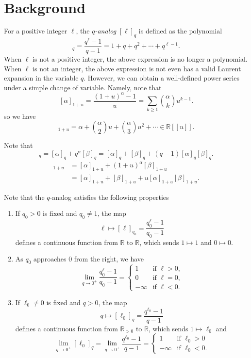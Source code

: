 \documentclass{amsart}
\theoremstyle{definition}
\newcommand{\RR}{\mathbb{R}}
\begin{document}
\section{Background}
For a positive integer $\ell$,
the {\em $q$-analog}
$[\ell]_q$ is defined as
the polynomial
\begin{equation*}
[\ell]_q = \frac{q^\ell - 1}{q - 1}
= 1 + q + q^2 + \cdots + q^{\ell -1} .
\end{equation*}
When $\ell$ is not a positive integer, the above expression is no longer a polynomial.
When $\ell$ is not an integer, the above expression is not even has a valid Laurent expansion in the variable $q$.
However, we can obtain a well-defined power series under a simple change of variable.
Namely, note that
\[ [\alpha]_{1+u} = \frac{(1+u)^\alpha - 1}{u}
= \sum_{k \geq 1} \binom{\alpha}{k}u^{k-1} .
\]
so we have 
\begin{equation}
[\alpha]_{1+u} = \alpha + \binom{\alpha}{2} u + \binom{\alpha}{3} u^2 + \cdots
\in \RR[[u]] .
\end{equation}

Note that
\begin{equation*}
[\alpha + \beta]_q =  [\alpha]_q + q^{\alpha} [\beta]_q
 = [\alpha]_q + [\beta]_q + (q-1) [\alpha]_q [\beta]_q .
\end{equation*}
\begin{align*}
[\alpha + \beta]_{1+u} &=  [\alpha]_{1+u} + (1+u)^{\alpha} [\beta]_{1+u} \\
 &= [\alpha]_{1+u} + [\beta]_{1+u} + u [\alpha]_{1+u} [\beta]_{1+u}.
\end{align*}


Note that the $q$-analog satisfies the following properties
\begin{enumerate}
\item If $q_0>0$ is fixed and $q_0 \neq 1$, the map 
$$\ell \mapsto [\ell]_{q_0} = \frac{q_0^\ell - 1}{q_0 - 1}$$
defines a continuous function from $\RR$ to $\RR$,
which sends $1 \mapsto 1$ and $0 \mapsto 0$.

\item As $q_0$ approaches $0$ from the right,
we have
$$ \lim_{q \to 0^+} \frac{q_0^\ell - 1}{q_0 - 1} = \begin{cases}
1 &\text{if } \ell > 0, \\
0 &\text{if } \ell = 0, \\
-\infty &\text{if } \ell < 0.
\end{cases} $$

\item If $\ell_0\neq 0$ is fixed and $q > 0$,
the map 
$$q \mapsto [\ell_0]_q = \frac{q^{\ell_0} - 1}{q - 1}$$
defines a continuous function from $\RR_{>0}$ to $\RR$,
which sends $1 \mapsto \ell_0$ and 
$$ \lim_{q \to 0^+} [\ell_0]_q  = 
\lim_{q \to 0^+} \frac{q^{\ell_0} - 1}{q - 1} =
\begin{cases}
 1 &\text{if } \ell_0 > 0 \\
 -\infty &\text{if } \ell_0 <0.
\end{cases}$$
\end{enumerate}
\end{document}
